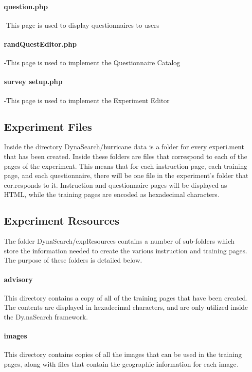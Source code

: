 \documentclass[article]{ij4uq}              %
\begin{document}
\paragraph{question.php} -This page is used to display questionnaires to users 

\paragraph{randQuestEditor.php} -This page is used to implement the Questionnaire Catalog 

\paragraph{survey setup.php} -This page is used to implement the Experiment Editor

\subsection{Experiment Files}
Inside the directory DynaSearch/hurricane data is a folder for every experi.ment that has been created. Inside these folders are files that correspond to each of the pages of the experiment. This means that for each instruction page, each training page, and each questionnaire, there will be one file in the experiment's folder that cor.responds to it. Instruction and questionnaire pages will be displayed as HTML, while the training pages are encoded as hexadecimal characters.

\subsection{Experiment Resources}
The folder DynaSearch/expResources contains a number of sub-folders which store the information needed to create the various instruction and training pages. The purpose of these folders is detailed below.

\paragraph{advisory}
This directory contains a copy of all of the training pages that have been created. The contents are displayed in hexadecimal characters, and are only utilized inside the Dy.naSearch framework.

\paragraph{images}
This directory contains copies of all the images that can be used in the training pages, along with files that contain the geographic information for each image.
\end{document}
